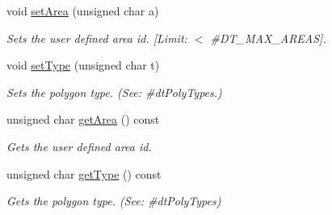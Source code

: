 \begin{DoxyCompactItemize}
\mbox{\label{structdtPoly_a84f05dcf69d70b26323b65a0c1c66954}} 
void \hyperlink{structdtPoly_a84f05dcf69d70b26323b65a0c1c66954}{set\+Area} (unsigned char a)
\begin{DoxyCompactList}\small\item\em Sets the user defined area id. \mbox{[}Limit\+: $<$ \#\+D\+T\+\_\+\+M\+A\+X\+\_\+\+A\+R\+E\+AS\mbox{]}. \end{DoxyCompactList}\item 
\mbox{\label{structdtPoly_ac625b3f1acf8df354a50464e210300dc}} 
void \hyperlink{structdtPoly_ac625b3f1acf8df354a50464e210300dc}{set\+Type} (unsigned char t)
\begin{DoxyCompactList}\small\item\em Sets the polygon type. (See\+: \#dt\+Poly\+Types.) \end{DoxyCompactList}\item 
\mbox{\label{structdtPoly_ab5e97720847977aa7a4caf8c75e73792}} 
unsigned char \hyperlink{structdtPoly_ab5e97720847977aa7a4caf8c75e73792}{get\+Area} () const
\begin{DoxyCompactList}\small\item\em Gets the user defined area id. \end{DoxyCompactList}\item 
\mbox{\label{structdtPoly_a12a7d5dcd2f1d7164531be4ecb5f35a4}} 
unsigned char \hyperlink{structdtPoly_a12a7d5dcd2f1d7164531be4ecb5f35a4}{get\+Type} () const
\begin{DoxyCompactList}\small\item\em Gets the polygon type. (See\+: \#dt\+Poly\+Types) \end{DoxyCompactList}\end{DoxyCompactItemize}
